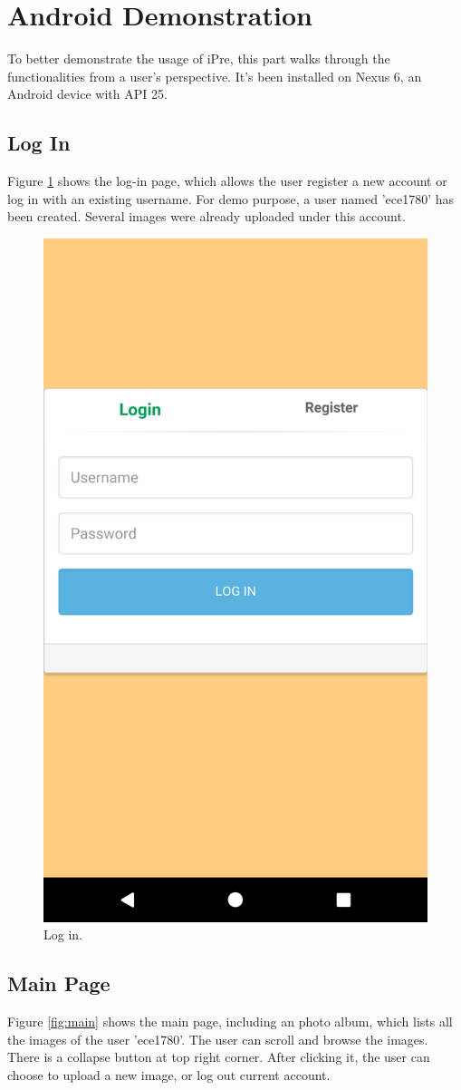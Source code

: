 \documentclass[conference]{IEEEtran}
\begin{document}
\section{Android Demonstration}
To better demonstrate the usage of iPre, this part walks through the functionalities from a user's perspective. It's been installed on Nexus 6, an Android device with API 25.

\subsection{Log In}
Figure \ref{fig:login} shows the log-in page, which allows the user register a new account or log in with an existing username. For demo purpose, a user named 'ece1780' has been created. Several images were already uploaded under this account.

\begin{figure}[h!]
  \centering
  \includegraphics[height=\linewidth]{login.png}
  \caption{Log in.}
  \label{fig:login}
\end{figure}

\subsection{Main Page}
Figure \ref{fig:main} shows the main page, including an photo album, which lists all the images of the user 'ece1780'. The user can scroll and browse the images. There is a collapse button at top right corner. After clicking it, the user can choose to upload a new image, or log out current account.
\end{document}
